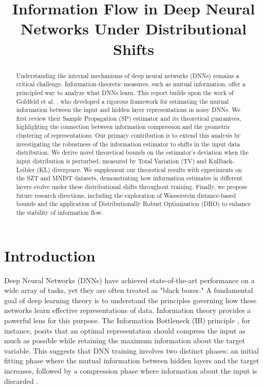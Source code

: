 \documentclass[conference]{IEEEtran}
\begin{document}
\title{Information Flow in Deep Neural Networks Under Distributional Shifts}

\author{
\and
{}
\and
{}
}

\maketitle

\begin{abstract}
Understanding the internal mechanisms of deep neural networks (DNNs) remains a critical challenge. Information-theoretic measures, such as mutual information, offer a principled way to analyze what DNNs learn. This report builds upon the work of Goldfeld et al.\cite{goldfeld2019estimating} , who developed a rigorous framework for estimating the mutual information between the input and hidden layer representations in noisy DNNs. We first review their Sample Propagation (SP) estimator and its theoretical guarantees, highlighting the connection between information compression and the geometric clustering of representations. Our primary contribution is to extend this analysis by investigating the robustness of the information estimator to shifts in the input data distribution. We derive novel theoretical bounds on the estimator's deviation when the input distribution is perturbed, measured by Total Variation (TV) and Kullback-Leibler (KL) divergence. We supplement our theoretical results with experiments on the SZT and MNIST datasets, demonstrating how information estimates in different layers evolve under these distributional shifts throughout training. Finally, we propose future research directions, including the exploration of Wasserstein distance-based bounds and the application of Distributionally Robust Optimization (DRO) to enhance the stability of information flow.
\end{abstract}


\section{Introduction}

Deep Neural Networks (DNNs) have achieved state-of-the-art performance on a wide array of tasks, yet they are often treated as "black boxes." A fundamental goal of deep learning theory is to understand the principles governing how these networks learn effective representations of data. Information theory provides a powerful lens for this purpose. The Information Bottleneck (IB) principle \cite{shwartz2017opening}, for instance, posits that an optimal representation should compress the input as much as possible while retaining the maximum information about the target variable. This suggests that DNN training involves two distinct phases: an initial fitting phase where the mutual information between hidden layers and the target increases, followed by a compression phase where information about the input is discarded \cite{tishby2015deep}.
\end{document}
